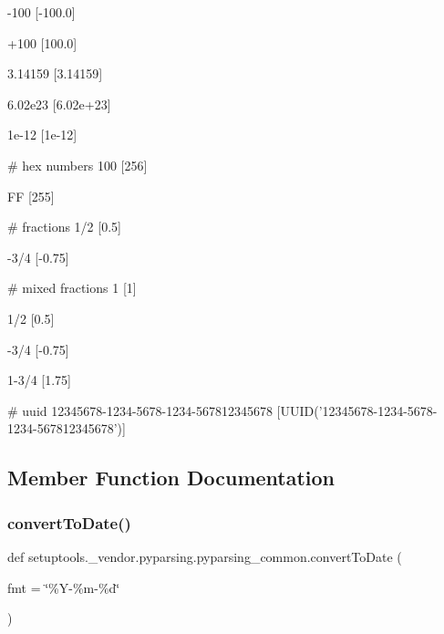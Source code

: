 \begin{DoxyVerb}
    -100
    [-100.0]

    +100
    [100.0]

    3.14159
    [3.14159]

    6.02e23
    [6.02e+23]

    1e-12
    [1e-12]

    # hex numbers
    100
    [256]

    FF
    [255]

    # fractions
    1/2
    [0.5]

    -3/4
    [-0.75]

    # mixed fractions
    1
    [1]

    1/2
    [0.5]

    -3/4
    [-0.75]

    1-3/4
    [1.75]

    # uuid
    12345678-1234-5678-1234-567812345678
    [UUID('12345678-1234-5678-1234-567812345678')]
\end{DoxyVerb}
 

\subsection{Member Function Documentation}
\mbox{\label{classsetuptools_1_1__vendor_1_1pyparsing_1_1pyparsing__common_a0ee473afab253b7d8c130f5bf2164b49}} 
\subsubsection{\texorpdfstring{convert\+To\+Date()}{convertToDate()}}
{\footnotesize\ttfamily def setuptools.\+\_\+vendor.\+pyparsing.\+pyparsing\+\_\+common.\+convert\+To\+Date (\begin{DoxyParamCaption}\item[{}]{fmt = {\ttfamily \char`\"{}\%Y-\/\%m-\/\%d\char`\"{}} }\end{DoxyParamCaption})\hspace{0.3cm}{\ttfamily [static]}}

